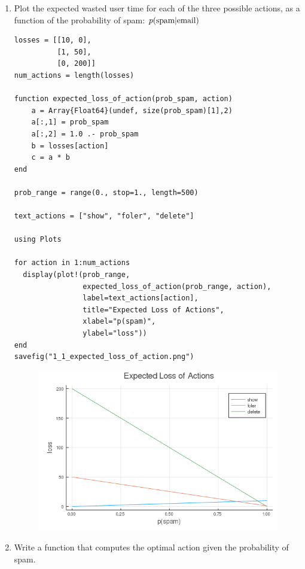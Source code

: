 \documentclass[12pt,letter]{article}
\begin{document}
\begin{enumerate}
\item Plot the expected wasted user time for each of the three possible actions, as a function of the probability of spam: $p(\textnormal{spam}|\textnormal{email})$
\begin{verbatim}
losses = [[10, 0],
          [1, 50],
          [0, 200]]
num_actions = length(losses)

function expected_loss_of_action(prob_spam, action)
    a = Array{Float64}(undef, size(prob_spam)[1],2)
    a[:,1] = prob_spam
    a[:,2] = 1.0 .- prob_spam
    b = losses[action]
    c = a * b
end

prob_range = range(0., stop=1., length=500)

text_actions = ["show", "foler", "delete"]

using Plots

for action in 1:num_actions
  display(plot!(prob_range, 
                expected_loss_of_action(prob_range, action),
                label=text_actions[action],
                title="Expected Loss of Actions",
                xlabel="p(spam)",
                ylabel="loss"))
end
savefig("1_1_expected_loss_of_action.png")
\end{verbatim}
  
  \pagebreak
  
\begin{figure}[h]
  \centering
  \includegraphics[width=14cm,keepaspectratio]{imgs/1_1_expected_loss_of_actions.png}
\end{figure}

\item Write a function that computes the optimal action given the probability of spam.
  

\end{enumerate}
\end{document}
